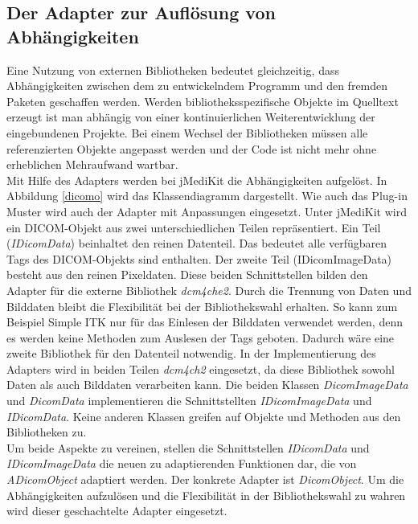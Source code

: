 \subsection{Der Adapter zur Auflösung von Abhängigkeiten} \label{adapter_dependencies}

Eine Nutzung von externen Bibliotheken bedeutet gleichzeitig, dass Abhängigkeiten zwischen dem zu entwickelndem Programm und den fremden Paketen geschaffen werden. Werden bibliotheksspezifische Objekte im Quelltext erzeugt ist man abhängig von einer kontinuierlichen Weiterentwicklung der eingebundenen Projekte. Bei einem Wechsel der Bibliotheken müssen alle referenzierten Objekte angepasst werden und der Code ist nicht mehr ohne erheblichen Mehraufwand wartbar.\\
Mit Hilfe des Adapters werden bei jMediKit die Abhängigkeiten aufgelöst. In Abbildung \ref{dicomo} wird das Klassendiagramm dargestellt. Wie auch das Plug-in Muster wird auch der Adapter mit Anpassungen eingesetzt. Unter jMediKit wird ein DICOM-Objekt aus zwei unterschiedlichen Teilen repräsentiert. Ein Teil (\textit{IDicomData}) beinhaltet den reinen Datenteil. Das bedeutet alle verfügbaren Tags des DICOM-Objekts sind enthalten. Der zweite Teil (IDicomImageData) besteht aus den reinen Pixeldaten. Diese beiden Schnittstellen bilden den Adapter für die externe Bibliothek \textit{dcm4che2}. Durch die Trennung von Daten und Bilddaten bleibt die Flexibilität bei der Bibliothekswahl erhalten. So kann zum Beispiel Simple ITK nur für das Einlesen der Bilddaten verwendet werden, denn es werden keine Methoden zum Auslesen der Tags geboten. Dadurch wäre eine zweite Bibliothek für den Datenteil notwendig. In der Implementierung des Adapters wird in beiden Teilen \textit{dcm4ch2} eingesetzt, da diese Bibliothek sowohl Daten als auch Bilddaten verarbeiten kann. Die beiden Klassen \textit{DicomImageData} und \textit{DicomData} implementieren die Schnittstellten \textit{IDicomImageData} und \textit{IDicomData}. Keine anderen Klassen greifen auf Objekte und Methoden aus den Bibliotheken zu.\\
Um beide Aspekte zu vereinen, stellen die Schnittstellen \textit{IDicomData} und \textit{IDicomImageData} die neuen zu adaptierenden Funktionen dar, die von \textit{ADicomObject} adaptiert werden. Der konkrete Adapter ist \textit{DicomObject}. Um die Abhängigkeiten aufzulösen und die Flexibilität in der Bibliothekswahl zu wahren wird dieser geschachtelte Adapter eingesetzt.

